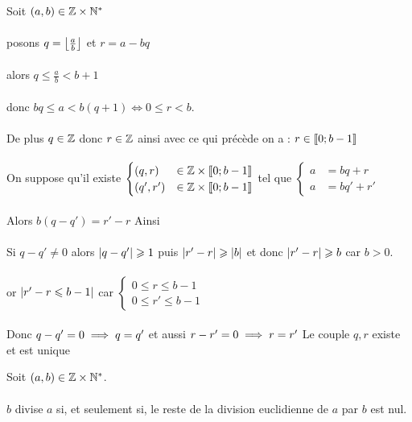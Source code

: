 \begin{dem}
    Soit \((a,b)\in \mathbb{Z} \times \mathbb{N}^*\)\\~\\
    \existence posons \(q = \left\lfloor\frac{a}{b}\right\rfloor\) et \(r = a-bq\)\\~\\
    alors \(q\leq \frac{a}{b}<b+1\)\\~\\
    donc \(bq\leq a < b(q+1) \iff 0\leq r<b\).\\~\\
    De plus \(q \in \mathbb{Z}\) donc \(r \in \mathbb{Z}\) ainsi avec ce qui précède on a : \(r \in \left\llbracket0;b-1\right\rrbracket\)\\~\\
    \unicite On suppose qu'il existe \(\begin{cases}
        (q,r) &\in \mathbb{Z} \times \left\llbracket0;b-1\right\rrbracket\\
        (q',r') &\in \mathbb{Z} \times \left\llbracket0;b-1\right\rrbracket\\
    \end{cases}\) tel que \(\begin{cases}
        a &= bq+r\\
        a &= bq'+r'
    \end{cases}\)
    \\~\\
    Alors \(b(q-q') = r'-r\) Ainsi\\~\\
    Si \(q-q' \neq 0\) alors \(\left\lvert q-q'\right\rvert\geqslant 1\) puis \(\left\lvert r'-r\right\rvert\geqslant \left\lvert b\right\rvert\) et donc \(\left\lvert r'-r\right\rvert\geqslant b\) car \(b>0\).\\~\\
    or \(\left\lvert r'-r\leqslant b-1\right\rvert\) car \(\begin{cases}
        0\leq r \leq b-1\\
        0\leq r' \leq b-1
    \end{cases}\) \\~\\
    Donc \(q-q' = 0 \implies q=q'\) et aussi \(r-r' = 0\implies r = r'\)
    \conclusion Le couple \(q,r\) existe et est unique 
\end{dem}


\begin{defprop} 
    Soit \((a, b) \in \mathbb{Z} \times \mathbb{N}^*\).\\~\\
    \(b\) divise \(a\) si, et seulement si, le reste de la division euclidienne de \(a\) par \(b\) est nul.
\end{defprop}

